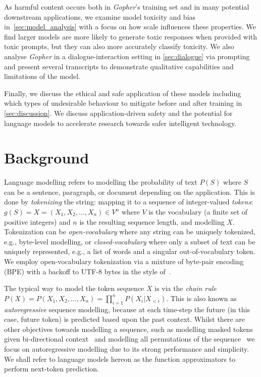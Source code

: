 \documentclass[11pt, a4paper, logo, internal, copyright, nonumbering]{deepmind}
\newcommand{\gopher}{\textit{Gopher}\xspace}
\begin{document}
As harmful content occurs both in \gopher's training set and in many potential downstream applications, we examine model toxicity and bias in~\autoref{sec:model_analysis} with a focus on how scale influences these properties. We find larger models are more likely to generate toxic responses when provided with toxic prompts, but they can also more accurately classify toxicity. 
We also analyse \gopher in a dialogue-interaction setting in \autoref{sec:dialogue} via prompting and present several transcripts to demonstrate qualitative capabilities and limitations of the model.


Finally, we discuss the ethical and safe application of these models including which types of undesirable behaviour to mitigate before and after training in \autoref{sec:discussion}. We discuss application-driven safety and the potential for language models to accelerate research towards safer intelligent technology.


\section{Background}
\label{background}
Language modelling refers to modelling the probability of text $P(S)$ where $S$ can be a sentence, paragraph, or document depending on the application. This is done by \textit{tokenizing} the string: mapping it to a sequence of integer-valued \textit{tokens}: $g(S) = X = (X_1, X_2, \ldots, X_n) \in V^n$ where $V$ is the vocabulary (a finite set of positive integers) and $n$ is the resulting sequence length, and modelling $X$. Tokenization can be \textit{open-vocabulary} where any string can be uniquely tokenized, e.g., byte-level modelling, or \textit{closed-vocabulary} where only a subset of text can be uniquely represented, e.g., a list of words and a singular out-of-vocabulary token. We employ open-vocabulary tokenization via a mixture of byte-pair encoding (BPE) with a backoff to UTF-8 bytes in the style of~\citet{radford2018improving}. 


The typical way to model the token sequence $X$ is via the \textit{chain rule} $P(X) = P(X_1, X_2, \ldots, X_n) = \prod_{i=1}^n P(X_i | X_{<i})$. This is also known as \textit{autoregressive} sequence modelling, because at each time-step the future (in this case, future token) is predicted based upon the past context. Whilst there are other objectives towards modelling a sequence, such as modelling masked tokens given bi-directional context~\citep{mikolov2013efficient, devlin2019bert} and modelling all permutations of the sequence~\citep{yang2019xlnet} we focus on autoregressive modelling due to its strong performance and simplicity. We shall refer to language models hereon as the function approximators to perform next-token prediction.
\end{document}
